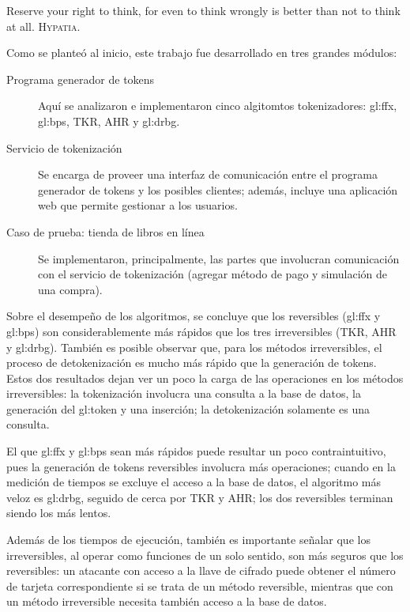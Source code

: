 %
%

{
  \epigrafe
  {%
    Reserve your right to think, for even to think wrongly is better than not to
    think at all.%
  }
  {%
    \textsc{Hypatia}.%
  }
}

\noindent
Como se planteó al inicio, este trabajo fue desarrollado en tres grandes
módulos:
\begin{description}
  \item [Programa generador de tokens] Aquí se analizaron e implementaron
    cinco algitomtos tokenizadores: \acrshort{gl:ffx}, \acrshort{gl:bps}, TKR,
    AHR y \acrshort{gl:drbg}.
  \item [Servicio de tokenización] Se encarga de proveer una interfaz de
    comunicación entre el programa generador de tokens y los posibles clientes;
    además, incluye una aplicación web que permite gestionar a los usuarios.
  \item [Caso de prueba: tienda de libros en línea] Se implementaron,
    principalmente, las partes que involucran comunicación con el servicio de
    tokenización (agregar método de pago y simulación de una compra).
\end{description}

Sobre el desempeño de los algoritmos, se concluye que los reversibles
(\acrshort{gl:ffx} y \acrshort{gl:bps}) son considerablemente más rápidos que
los tres irreversibles (TKR, AHR y \acrshort{gl:drbg}). También es posible
observar que, para los métodos irreversibles, el proceso de detokenización es
mucho más rápido que la generación de tokens.  Estos dos resultados dejan ver
un poco la carga de las operaciones en los métodos irreversibles: la
tokenización involucra una consulta a la base de datos, la generación del
\gls{gl:token} y una inserción; la detokenización solamente es una consulta.

El que \acrshort{gl:ffx} y \acrshort{gl:bps} sean más rápidos puede resultar
un poco contraintuitivo, pues la generación de tokens reversibles involucra
más operaciones; cuando en la medición de tiempos se excluye el acceso a  la
base de datos, el algoritmo más veloz es \acrshort{gl:drbg}, seguido de cerca
por TKR y AHR; los dos reversibles terminan siendo los más lentos.

Además de los tiempos de ejecución, también es importante señalar que los
irreversibles, al operar como funciones de un solo sentido, son más seguros
que los reversibles: un atacante con acceso a la llave de cifrado puede
obtener el número de tarjeta correspondiente si se trata de un método
reversible, mientras que con un método irreversible necesita también acceso a
la base de datos.

